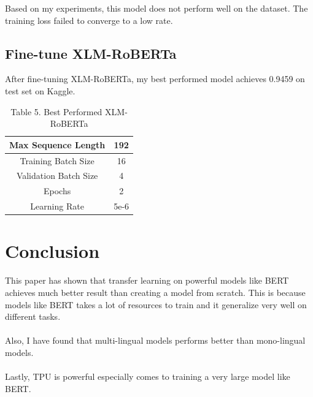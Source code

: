 \documentclass[11pt,a4paper]{article}
\begin{document}
Based on my experiments, this model does not perform well on the dataset. The training loss failed to converge to a low rate.

\subsection{Fine-tune XLM-RoBERTa}

After fine-tuning XLM-RoBERTa, my best performed model achieves 0.9459 on test set on Kaggle.\\

\begin{table}[!htbp]
	\centering
	\begin{tabular}{|c|c|}
		\hline
		{Max Sequence Length}   & 192  \\ \hline
		{Training Batch Size}   & 16   \\ \hline
		{Validation Batch Size} & 4    \\ \hline
		{Epochs}                & 2    \\ \hline
		{Learning Rate}         & 5e-6 \\ \hline
	\end{tabular}
	\caption{Table 5. Best Performed XLM-RoBERTa}
\end{table}


\section{Conclusion}

This paper has shown that transfer learning on powerful models like BERT achieves much better result than creating a model from scratch. This is because models like BERT takes a lot of resources to train and it generalize very well on different tasks.\\
\\
Also, I have found that multi-lingual models performs better than mono-lingual models.\\
\\
Lastly, TPU is powerful especially comes to training a very large model like BERT.\\


\newpage
\

\end{document}
